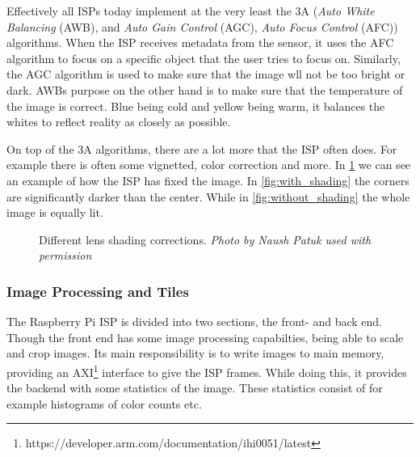 Effectively all ISPs today implement at the very least the 3A (\textit{Auto
White Balancing} (AWB), and \textit{Auto Gain Control} (AGC), \textit{Auto
Focus Control} (AFC)) algorithms. When the ISP receives metadata from the
sensor, it uses the AFC algorithm to focus on a specific object that the user
tries to focus on. Similarly, the AGC algorithm is used to make sure that the
image wll not be too bright or dark. AWBs purpose on the other hand is to make
sure that the temperature of the image is correct. Blue being cold and yellow
being warm, it balances the whites to reflect reality as closely as possible.

On top of the 3A algorithms, there are a lot more that the ISP often does. For
example there is often some vignetted, color correction and more. In
\cref{fig:lens_shading} we can see an example of how the ISP has fixed the image.
In \cref{fig:with_shading} the corners are significantly darker than the center.
While in \cref{fig:without_shading} the whole image is equally lit.

\begin{figure}[htpb]
    \centering
    \qquad

    \caption{Different lens shading corrections. \textit{Photo by Naush Patuk used with permission}}\label{fig:lens_shading}
\end{figure}

\subsubsection{Image Processing and Tiles}
The Raspberry Pi ISP is divided into two sections, the front- and back end.
Though the front end has some image processing capabilties, being able to scale
and crop images. Its main responsibility is to write images to main memory,
providing an
AXI\footnote{https://developer.arm.com/documentation/ihi0051/latest} interface
to give the ISP frames. While doing this, it provides the backend with some
statistics of the image. These statistics consist of for example histograms
of color counts etc.

